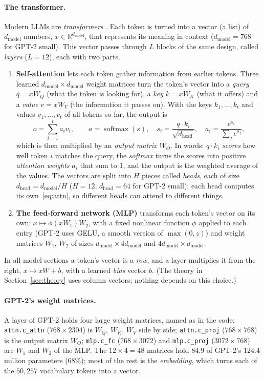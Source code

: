 \documentclass[10pt]{article}
\theoremstyle{plain}
\theoremstyle{definition}
\theoremstyle{remark}
\newcommand{\R}{\mathbb{R}}
\newcommand{\softmax}{\operatorname{softmax}}
\newcommand{\dmodel}{d_{\mathrm{model}}}
\newcommand{\dhead}{d_{\mathrm{head}}}
\newcommand{\mtx}[1]{\texttt{#1}}
\begin{document}
\paragraph{The transformer.}
Modern LLMs are \emph{transformers} \cite{vaswani2017}. Each token is turned into a vector (a list) of $\dmodel$ numbers, $x\in\R^{\dmodel}$, that represents its meaning in context ($\dmodel=768$ for GPT-2 small). This vector passes through $L$ blocks of the same design, called \emph{layers} ($L=12$), each with two parts.
\begin{enumerate}[leftmargin=2em,itemsep=1pt]
\item \textbf{Self-attention} lets each token gather information from earlier tokens. Three learned $\dmodel\times\dmodel$ weight matrices turn the token's vector into a \emph{query} $q=xW_Q$ (what the token is looking for), a \emph{key} $k=xW_K$ (what it offers) and a \emph{value} $v=xW_V$ (the information it passes on). With the keys $k_1,\dots,k_t$ and values $v_1,\dots,v_t$ of all tokens so far, the output is
\begin{equation}\label{eq:attn}
o=\sum_{i=1}^{t}a_i v_i,\qquad
a=\softmax(s),\quad s_i=\frac{q\cdot k_i}{\sqrt{\dhead}},\quad a_i=\frac{e^{s_i}}{\sum_je^{s_j}},
\end{equation}
which is then multiplied by an \emph{output matrix} $W_O$. In words: $q\cdot k_i$ \emph{scores} how well token $i$ matches the query, the \emph{softmax} turns the scores into positive \emph{attention weights} $a_i$ that sum to 1, and the output is the weighted average of the values. The vectors are split into $H$ pieces called \emph{heads}, each of size $\dhead=\dmodel/H$ ($H=12$, $\dhead=64$ for GPT-2 small); each head computes its own~\eqref{eq:attn}, so different heads can attend to different things.
\item \textbf{The feed-forward network (MLP)} transforms each token's vector on its own: $x\mapsto\phi(xW_1)W_2$, with a fixed nonlinear function $\phi$ applied to each entry (GPT-2 uses GELU, a smooth version of $\max(0,z)$) and weight matrices $W_1$, $W_2$ of sizes $\dmodel\times4\dmodel$ and $4\dmodel\times\dmodel$.
\end{enumerate}
In all model sections a token's vector is a \emph{row}, and a layer multiplies it from the right, $x\mapsto xW+b$, with a learned \emph{bias} vector $b$. (The theory in Section~\ref{sec:theory} uses column vectors; nothing depends on this choice.)

\paragraph{GPT-2's weight matrices.}
A layer of GPT-2 holds four large weight matrices, named as in the code:
\mtx{attn.c\_attn} ($768\times2304$) is $W_Q$, $W_K$, $W_V$ side by side;
\mtx{attn.c\_proj} ($768\times768$) is the output matrix $W_O$;
\mtx{mlp.c\_fc} ($768\times3072$) and \mtx{mlp.c\_proj} ($3072\times768$) are $W_1$ and $W_2$ of the MLP.
The $12\times4=48$ matrices hold $84.9$ of GPT-2's $124.4$ million parameters ($68\%$); most of the rest is the \emph{embedding}, which turns each of the $50{,}257$ vocabulary tokens into a vector.
\end{document}
